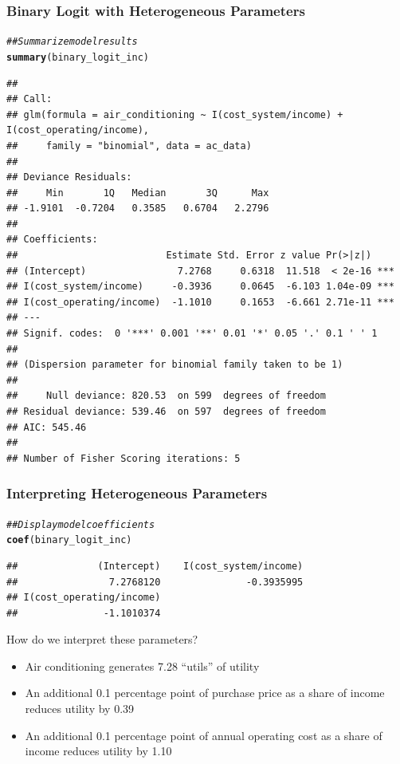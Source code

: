 \documentclass{beamer}\usepackage[]{graphicx}\usepackage[]{color}
\makeatletter
\newcommand{\hlcom}[1]{\textcolor[rgb]{0.678,0.584,0.686}{\textit{#1}}}%
\newcommand{\hlstd}[1]{\textcolor[rgb]{0.345,0.345,0.345}{#1}}%
\newcommand{\hlkwd}[1]{\textcolor[rgb]{0.737,0.353,0.396}{\textbf{#1}}}%
\newenvironment{kframe}{%
 \def\at@end@of@kframe{}%
 \ifinner\ifhmode%
  \def\at@end@of@kframe{\end{minipage}}%
  \begin{minipage}{\columnwidth}%
 \fi\fi%
 \def\FrameCommand##1{\hskip\@totalleftmargin \hskip-\fboxsep
 \colorbox{shadecolor}{##1}\hskip-\fboxsep
     \hskip-\linewidth \hskip-\@totalleftmargin \hskip\columnwidth}%
 \MakeFramed {\advance\hsize-\width
   \@totalleftmargin\z@ \linewidth\hsize
   \@setminipage}}%
 {\par\unskip\endMakeFramed%
 \at@end@of@kframe}
\newenvironment{knitrout}{}{} %
\makeatother
\begin{document}
\begin{frame}[fragile]\frametitle{Binary Logit with Heterogeneous Parameters}
\begin{knitrout}\tiny
{}\color{fgcolor}\begin{kframe}
\begin{alltt}
\hlcom{## Summarize model results}
\hlkwd{summary}\hlstd{(binary_logit_inc)}
\end{alltt}
\begin{verbatim}
## 
## Call:
## glm(formula = air_conditioning ~ I(cost_system/income) + I(cost_operating/income), 
##     family = "binomial", data = ac_data)
## 
## Deviance Residuals: 
##     Min       1Q   Median       3Q      Max  
## -1.9101  -0.7204   0.3585   0.6704   2.2796  
## 
## Coefficients:
##                          Estimate Std. Error z value Pr(>|z|)    
## (Intercept)                7.2768     0.6318  11.518  < 2e-16 ***
## I(cost_system/income)     -0.3936     0.0645  -6.103 1.04e-09 ***
## I(cost_operating/income)  -1.1010     0.1653  -6.661 2.71e-11 ***
## ---
## Signif. codes:  0 '***' 0.001 '**' 0.01 '*' 0.05 '.' 0.1 ' ' 1
## 
## (Dispersion parameter for binomial family taken to be 1)
## 
##     Null deviance: 820.53  on 599  degrees of freedom
## Residual deviance: 539.46  on 597  degrees of freedom
## AIC: 545.46
## 
## Number of Fisher Scoring iterations: 5
\end{verbatim}
\end{kframe}
\end{knitrout}
\end{frame}

\begin{frame}[fragile]\frametitle{Interpreting Heterogeneous Parameters}
\begin{knitrout}\footnotesize
{}\color{fgcolor}\begin{kframe}
\begin{alltt}
\hlcom{## Display model coefficients}
\hlkwd{coef}\hlstd{(binary_logit_inc)}
\end{alltt}
\begin{verbatim}
##              (Intercept)    I(cost_system/income) 
##                7.2768120               -0.3935995 
## I(cost_operating/income) 
##               -1.1010374
\end{verbatim}
\end{kframe}
\end{knitrout}
    \vspace{2ex}
    How do we interpret these parameters?
    \begin{itemize}
        \item Air conditioning generates 7.28 ``utils'' of utility
        \item An additional 0.1 percentage point of purchase price as a share of income reduces utility by 0.39
        \item An additional 0.1 percentage point of annual operating cost as a share of income reduces utility by 1.10
    \end{itemize}
\end{frame}
\end{document}
